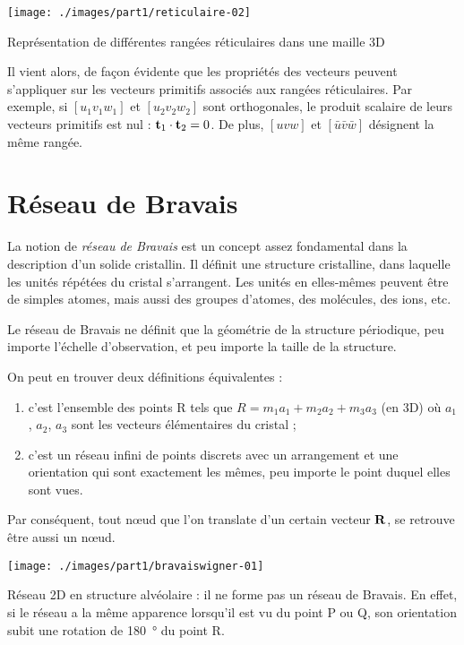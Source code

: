\begin{marginfigure}
    \texttt{[image: ./images/part1/reticulaire-02]}
    \caption{Représentation de différentes rangées réticulaires dans une maille 3D}
    \label{fig:rangees3D}
\end{marginfigure}

Il vient alors, de façon évidente que les propriétés des vecteurs peuvent 
s'appliquer sur les vecteurs primitifs associés aux rangées réticulaires. Par
exemple, si $[u_1v_1w_1]$ et $[u_2v_2w_2]$ sont orthogonales, le produit 
scalaire de leurs vecteurs primitifs est nul :
$\mathbf{t}_1 \cdot \mathbf{t}_2 = 0$. De plus, $[uvw]$ et
$[\bar{u}\bar{v}\bar{w}]$ désignent la même rangée.

\section{Réseau de Bravais}

La notion de \emph{réseau de Bravais} est un concept assez fondamental dans la
description d'un solide cristallin. Il définit une structure cristalline, dans
laquelle les unités répétées du cristal s'arrangent. Les unités en elles-mêmes
peuvent être de simples atomes, mais aussi des groupes d'atomes, des molécules, des ions, etc.

Le réseau de Bravais ne définit que la géométrie de la structure périodique,
peu importe l'échelle d'observation, et peu importe la taille de la structure.

On peut en trouver deux définitions équivalentes :
\begin{enumerate}
    \item \label{bravaisa} c'est l'ensemble des points R tels que
    $R = m_1 a_1 + m_2 a_2 + m_3 a_3$ (en 3D) où $a_1$, $a_2$, $a_3$ sont les
    vecteurs élémentaires du cristal ;
\item c'est un réseau infini de points discrets avec un arrangement et une
    orientation qui sont exactement les mêmes, peu importe le point duquel elles
     sont vues.
\end{enumerate}

Par conséquent, tout nœud que l'on translate d'un certain vecteur 
$\mathbf{R}$, se retrouve être aussi un nœud.

\begin{marginfigure}
    \texttt{[image: ./images/part1/bravaiswigner-01]}
    \caption{Réseau 2D en structure alvéolaire : il ne forme pas un réseau de Bravais. En effet, si le réseau a la même apparence lorsqu'il est vu du point P ou Q, son orientation subit une rotation de \SI{180}{\degree} du point R.}
    \label{fig:alveolaire}
\end{marginfigure}

